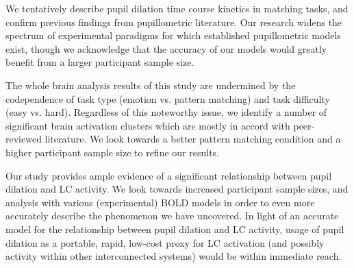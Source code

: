 	    We tentatively describe pupil dilation time course kinetics in matching tasks, and confirm previous findings from pupillometric literature.
	    Our research widens the spectrum of experimental paradigms for which established pupillometric models exist, though we acknowledge that the accuracy of our models would greatly benefit from a larger participant sample size.
	    
	    The whole brain analysis results of this study are undermined by the codependence of task type (emotion vs. pattern matching) and task difficulty (easy vs. hard).
	    Regardless of this noteworthy issue, we identify a number of significant brain activation clusters which are mostly in accord with peer-reviewed literature.
	    We look towards a better pattern matching condition and a higher participant sample size to refine our results.  
	    
	    Our study provides ample evidence of a significant relationship between pupil dilation and LC activity.
	    We look towards increased participant sample sizes, and analysis with various (experimental) BOLD models in order to even more accurately describe the phenomenon we have uncovered.
	    In light of an accurate model for the relationship between pupil dilation and LC activity, usage of pupil dilation as a portable, rapid, low-cost proxy for LC activation (and possibly activity within other interconnected systems) would be within immediate reach.
